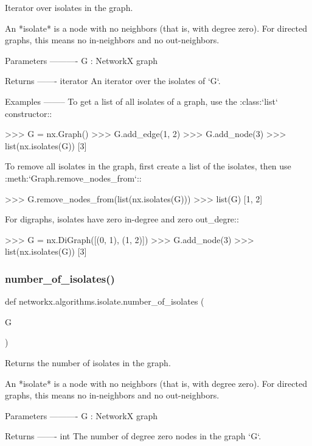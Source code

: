 \begin{DoxyVerb}Iterator over isolates in the graph.

An *isolate* is a node with no neighbors (that is, with degree
zero). For directed graphs, this means no in-neighbors and no
out-neighbors.

Parameters
----------
G : NetworkX graph

Returns
-------
iterator
    An iterator over the isolates of `G`.

Examples
--------
To get a list of all isolates of a graph, use the :class:`list`
constructor::

    >>> G = nx.Graph()
    >>> G.add_edge(1, 2)
    >>> G.add_node(3)
    >>> list(nx.isolates(G))
    [3]

To remove all isolates in the graph, first create a list of the
isolates, then use :meth:`Graph.remove_nodes_from`::

    >>> G.remove_nodes_from(list(nx.isolates(G)))
    >>> list(G)
    [1, 2]

For digraphs, isolates have zero in-degree and zero out_degre::

    >>> G = nx.DiGraph([(0, 1), (1, 2)])
    >>> G.add_node(3)
    >>> list(nx.isolates(G))
    [3]\end{DoxyVerb}
 \mbox{\label{namespacenetworkx_1_1algorithms_1_1isolate_a22ad14324f84b73111b34769d4e5466e}} 
\subsubsection{\texorpdfstring{number\+\_\+of\+\_\+isolates()}{number\_of\_isolates()}}
{\footnotesize\ttfamily def networkx.\+algorithms.\+isolate.\+number\+\_\+of\+\_\+isolates (\begin{DoxyParamCaption}\item[{}]{G }\end{DoxyParamCaption})}

\begin{DoxyVerb}Returns the number of isolates in the graph.

An *isolate* is a node with no neighbors (that is, with degree
zero). For directed graphs, this means no in-neighbors and no
out-neighbors.

Parameters
----------
G : NetworkX graph

Returns
-------
int
    The number of degree zero nodes in the graph `G`.\end{DoxyVerb}
 